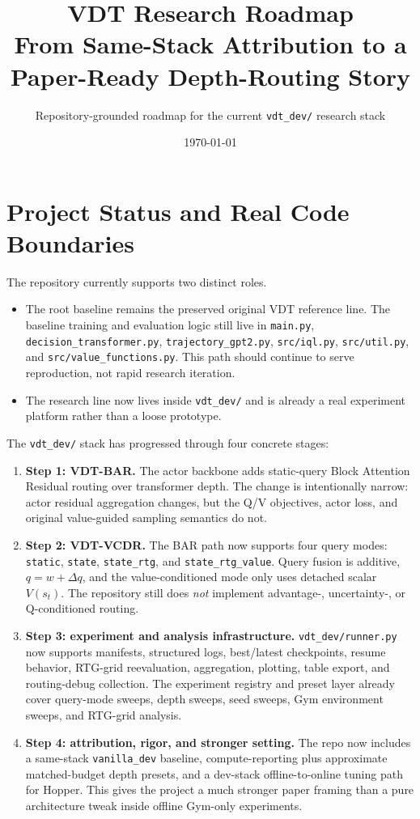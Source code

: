 \documentclass[11pt]{article}
\title{\textbf{VDT Research Roadmap}\\From Same-Stack Attribution to a Paper-Ready Depth-Routing Story}
\author{Repository-grounded roadmap for the current \texttt{vdt\_dev/} research stack}
\date{\today}
\newcommand{\vdt}{\textsc{VDT}}
\newcommand{\barname}{\textsc{VDT-BAR}}
\newcommand{\vcdr}{\textsc{VDT-VCDR}}
\newcommand{\vanilla}{\texttt{vanilla\_dev}}
\begin{document}
\maketitle

\section{Project Status and Real Code Boundaries}

The repository currently supports two distinct roles.

\begin{itemize}
  \item The root baseline remains the preserved original \vdt{} reference line. The baseline training and evaluation logic still live in \texttt{main.py}, \texttt{decision\_transformer.py}, \texttt{trajectory\_gpt2.py}, \texttt{src/iql.py}, \texttt{src/util.py}, and \texttt{src/value\_functions.py}. This path should continue to serve reproduction, not rapid research iteration.
  \item The research line now lives inside \texttt{vdt\_dev/} and is already a real experiment platform rather than a loose prototype.
\end{itemize}

The \texttt{vdt\_dev/} stack has progressed through four concrete stages:

\begin{enumerate}
  \item \textbf{Step 1: \barname{}.} The actor backbone adds static-query Block Attention Residual routing over transformer depth. The change is intentionally narrow: actor residual aggregation changes, but the Q/V objectives, actor loss, and original value-guided sampling semantics do not.
  \item \textbf{Step 2: \vcdr{}.} The BAR path now supports four query modes: \texttt{static}, \texttt{state}, \texttt{state\_rtg}, and \texttt{state\_rtg\_value}. Query fusion is additive, \(q = w + \Delta q\), and the value-conditioned mode only uses detached scalar \(V(s_t)\). The repository still does \emph{not} implement advantage-, uncertainty-, or Q-conditioned routing.
  \item \textbf{Step 3: experiment and analysis infrastructure.} \texttt{vdt\_dev/runner.py} now supports manifests, structured logs, best/latest checkpoints, resume behavior, RTG-grid reevaluation, aggregation, plotting, table export, and routing-debug collection. The experiment registry and preset layer already cover query-mode sweeps, depth sweeps, seed sweeps, Gym environment sweeps, and RTG-grid analysis.
  \item \textbf{Step 4: attribution, rigor, and stronger setting.} The repo now includes a same-stack \vanilla{} baseline, compute-reporting plus approximate matched-budget depth presets, and a dev-stack offline-to-online tuning path for Hopper. This gives the project a much stronger paper framing than a pure architecture tweak inside offline Gym-only experiments.
\end{enumerate}
\end{document}

